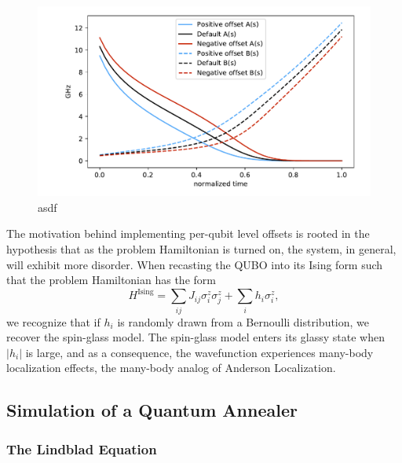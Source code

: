 \documentclass[prd,twocolumn,tightenlines,preprintnumbers,showpacs,superscriptaddress,notitlepage,nofootinbib,eqsecnum,floatfix,longbibliography]{revtex4}
\begin{document}
\begin{figure}[htb]
    \centering
    \includegraphics[width=\columnwidth]{./figures/anneal_schedule.pdf}
    \caption{asdf}
    \label{fig:anneal_schedule}
\end{figure}

The motivation behind implementing per-qubit level offsets is rooted in the hypothesis that as the problem Hamiltonian is turned on, the system, in general, will exhibit more disorder.
When recasting the QUBO into its Ising form such that the problem Hamiltonian has the form
\begin{equation}
    H^{\textrm{Ising}} = \sum_{ij} J_{ij} \sigma^z_i \sigma^z_j + \sum_i h_i \sigma^z_i,
\end{equation}
we recognize that if $h_i$ is randomly drawn from a Bernoulli distribution, we recover the spin-glass model.
The spin-glass model enters its glassy state when $|h_i|$ is large, and as a consequence, the wavefunction experiences many-body localization effects, the many-body analog of Anderson Localization.


\subsection{Simulation of a Quantum Annealer}
\label{sec:methods:simulation}

\subsubsection{The Lindblad Equation}
\label{sec:methods:lindblad}
\end{document}
